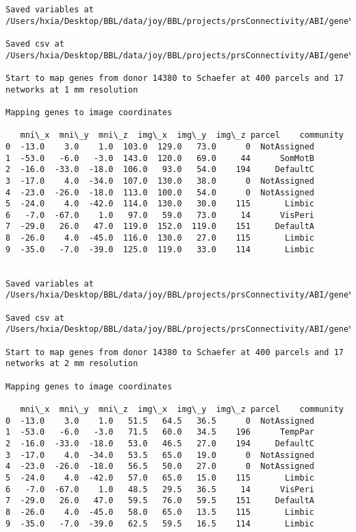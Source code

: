 \documentclass[11pt]{article}
\begin{document}
\begin{Verbatim}[commandchars=\\\{\}]
Saved variables at /Users/hxia/Desktop/BBL/data/joy/BBL/projects/prsConnectivity/ABI/gene\_mapping/14380donor\_400Parcels\_7Network\_2mm.pkl

Saved csv at /Users/hxia/Desktop/BBL/data/joy/BBL/projects/prsConnectivity/ABI/gene\_mapping/14380donor\_400Parcels\_7Network\_2mm.csv

Start to map genes from donor 14380 to Schaefer at 400 parcels and 17 networks at 1 mm resolution

Mapping genes to image coordinates

   mni\_x  mni\_y  mni\_z  img\_x  img\_y  img\_z parcel    community
0  -13.0    3.0    1.0  103.0  129.0   73.0      0  NotAssigned
1  -53.0   -6.0   -3.0  143.0  120.0   69.0     44      SomMotB
2  -16.0  -33.0  -18.0  106.0   93.0   54.0    194     DefaultC
3  -17.0    4.0  -34.0  107.0  130.0   38.0      0  NotAssigned
4  -23.0  -26.0  -18.0  113.0  100.0   54.0      0  NotAssigned
5  -24.0    4.0  -42.0  114.0  130.0   30.0    115       Limbic
6   -7.0  -67.0    1.0   97.0   59.0   73.0     14      VisPeri
7  -29.0   26.0   47.0  119.0  152.0  119.0    151     DefaultA
8  -26.0    4.0  -45.0  116.0  130.0   27.0    115       Limbic
9  -35.0   -7.0  -39.0  125.0  119.0   33.0    114       Limbic


Saved variables at /Users/hxia/Desktop/BBL/data/joy/BBL/projects/prsConnectivity/ABI/gene\_mapping/14380donor\_400Parcels\_17Network\_1mm.pkl

Saved csv at /Users/hxia/Desktop/BBL/data/joy/BBL/projects/prsConnectivity/ABI/gene\_mapping/14380donor\_400Parcels\_17Network\_1mm.csv

Start to map genes from donor 14380 to Schaefer at 400 parcels and 17 networks at 2 mm resolution

Mapping genes to image coordinates

   mni\_x  mni\_y  mni\_z  img\_x  img\_y  img\_z parcel    community
0  -13.0    3.0    1.0   51.5   64.5   36.5      0  NotAssigned
1  -53.0   -6.0   -3.0   71.5   60.0   34.5    196      TempPar
2  -16.0  -33.0  -18.0   53.0   46.5   27.0    194     DefaultC
3  -17.0    4.0  -34.0   53.5   65.0   19.0      0  NotAssigned
4  -23.0  -26.0  -18.0   56.5   50.0   27.0      0  NotAssigned
5  -24.0    4.0  -42.0   57.0   65.0   15.0    115       Limbic
6   -7.0  -67.0    1.0   48.5   29.5   36.5     14      VisPeri
7  -29.0   26.0   47.0   59.5   76.0   59.5    151     DefaultA
8  -26.0    4.0  -45.0   58.0   65.0   13.5    115       Limbic
9  -35.0   -7.0  -39.0   62.5   59.5   16.5    114       Limbic



\end{Verbatim}
\end{document}
